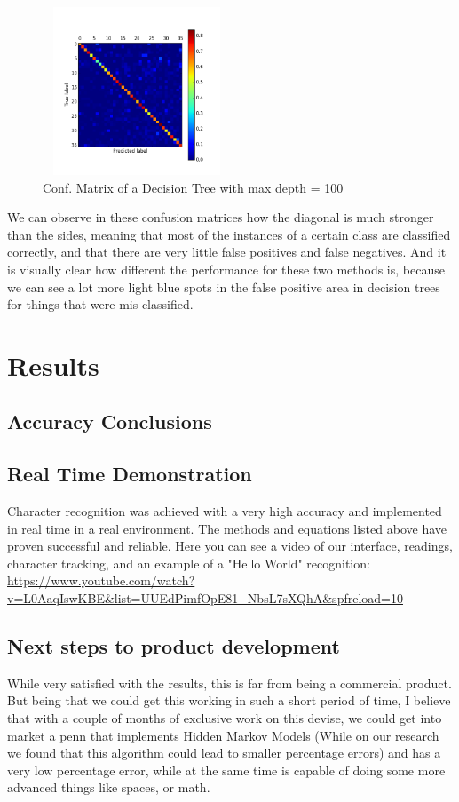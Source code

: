 \documentclass{article}
\begin{document}
\begin{figure}[H]
	\centering
	\includegraphics[width=0.5\textwidth, height= 5cm]{cm_tree1_dt.png}
	\caption{Conf. Matrix of a Decision Tree with max depth = 100}
\end{figure} 
We can observe in these confusion matrices how the diagonal is much stronger than the sides, meaning that most of the instances of a certain class are classified correctly, and that there are very little false positives and false negatives.
And it is visually clear how different the performance for these two methods is, because we can see a lot more light blue spots in the false positive area in decision trees for things that were mis-classified.


\section{Results}
\subsection{Accuracy Conclusions}

\subsection{Real Time Demonstration}
Character recognition was achieved with a very high accuracy and implemented in real time in a real environment. The methods and equations listed above have proven successful and reliable.\newline
Here you can see a video of our interface, readings, character tracking, and an example of a "Hello World" recognition: 
\url{https://www.youtube.com/watch?v=L0AaqIswKBE&list=UUEdPimfOpE81_NbsL7sXQhA&spfreload=10} \newline \newline

\subsection{Next steps to product development}
While very satisfied with the results, this is far from being a commercial product. But being that we could get this working in such a short period of time, I believe that with a couple of months of exclusive work on this devise, we could get into market a penn that implements Hidden Markov Models (While on our research we found that this algorithm could lead to smaller percentage errors) and has a very low percentage error, while at the same time is capable of doing some more advanced things like spaces, or math. 
\end{document}
